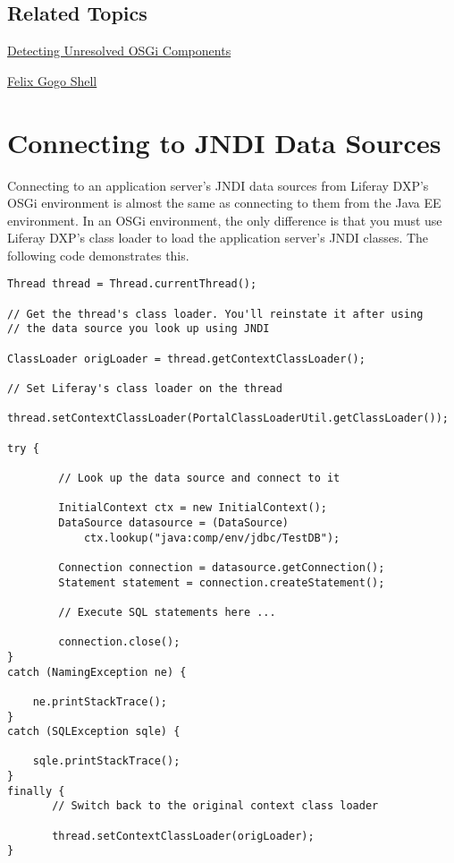 \section{Related Topics}\label{related-topics-30}

\href{/docs/7-2/appdev/-/knowledge_base/a/detecting-unresolved-osgi-components}{Detecting
Unresolved OSGi Components}

\href{/docs/7-2/customization/-/knowledge_base/c/using-the-felix-gogo-shell}{Felix
Gogo Shell}

\chapter{Connecting to JNDI Data
Sources}\label{connecting-to-jndi-data-sources}

Connecting to an application server's JNDI data sources from Liferay
DXP's OSGi environment is almost the same as connecting to them from the
Java EE environment. In an OSGi environment, the only difference is that
you must use Liferay DXP's class loader to load the application server's
JNDI classes. The following code demonstrates this.

\begin{verbatim}
Thread thread = Thread.currentThread();

// Get the thread's class loader. You'll reinstate it after using
// the data source you look up using JNDI

ClassLoader origLoader = thread.getContextClassLoader();

// Set Liferay's class loader on the thread

thread.setContextClassLoader(PortalClassLoaderUtil.getClassLoader());

try {

        // Look up the data source and connect to it

        InitialContext ctx = new InitialContext();
        DataSource datasource = (DataSource)
            ctx.lookup("java:comp/env/jdbc/TestDB");

        Connection connection = datasource.getConnection();
        Statement statement = connection.createStatement();

        // Execute SQL statements here ...

        connection.close();
}
catch (NamingException ne) {

    ne.printStackTrace();
}
catch (SQLException sqle) {

    sqle.printStackTrace();
}
finally {
       // Switch back to the original context class loader

       thread.setContextClassLoader(origLoader);
}
\end{verbatim}

